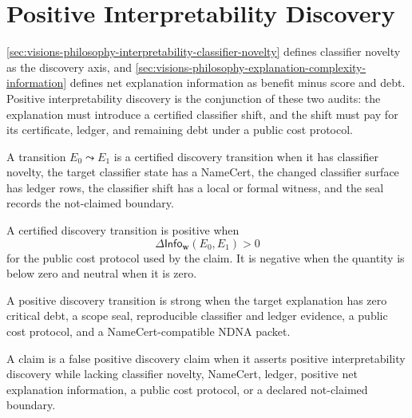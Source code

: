\section{Positive Interpretability Discovery}
\label{sec:visions-philosophy-positive-interpretability-discovery}

\autoref{sec:visions-philosophy-interpretability-classifier-novelty}
defines classifier novelty as the discovery axis, and
\autoref{sec:visions-philosophy-explanation-complexity-information}
defines net explanation information as benefit minus score and debt.
Positive interpretability discovery is the conjunction of these two
audits: the explanation must introduce a certified classifier shift, and
the shift must pay for its certificate, ledger, and remaining debt under
a public cost protocol.

\begin{definition}
\label{def:philosophy-certified-discovery-transition}
A transition $E_0\leadsto E_1$ is a certified discovery transition when
it has classifier novelty, the target classifier state has a NameCert,
the changed classifier surface has ledger rows, the classifier shift has
a local or formal witness, and the seal records the not-claimed
boundary.
\end{definition}

\begin{definition}
\label{def:philosophy-positive-discovery-transition}
A certified discovery transition is positive when
$$
\Delta\mathsf{Info}_{\mathbf w}(E_0,E_1)>0
$$
for the public cost protocol used by the claim. It is negative when the
quantity is below zero and neutral when it is zero.
\end{definition}

\begin{definition}
\label{def:philosophy-strong-positive-discovery}
A positive discovery transition is strong when the target explanation has
zero critical debt, a scope seal, reproducible classifier and ledger
evidence, a public cost protocol, and a NameCert-compatible NDNA packet.
\end{definition}

\begin{definition}
\label{def:philosophy-false-positive-discovery-claim}
A claim is a false positive discovery claim when it asserts positive
interpretability discovery while lacking classifier novelty, NameCert,
ledger, positive net explanation information, a public cost protocol, or
a declared not-claimed boundary.
\end{definition}

